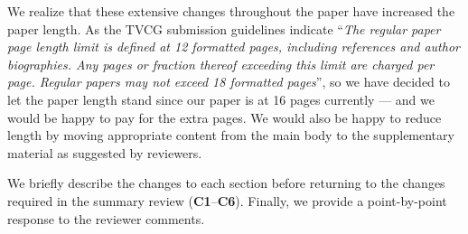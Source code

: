 We realize that these extensive changes throughout the paper have increased the paper length. As the TVCG submission guidelines indicate ``\emph{The regular paper page length limit is defined at 12 formatted
pages, including references and author biographies. Any pages or
fraction thereof exceeding this limit are charged  per page. Regular
papers may not exceed 18 formatted pages}'', so we have decided to let the paper length stand since our paper is at 16 pages currently — and we would be happy to pay for the extra pages. We would also be happy to reduce length by moving appropriate content from the main body to the supplementary material as suggested by reviewers. 

We briefly describe the changes to each section
before returning to the changes required in the summary review  
({\bf C1}--{\bf C6}). Finally, we provide a point-by-point response to the reviewer comments.

